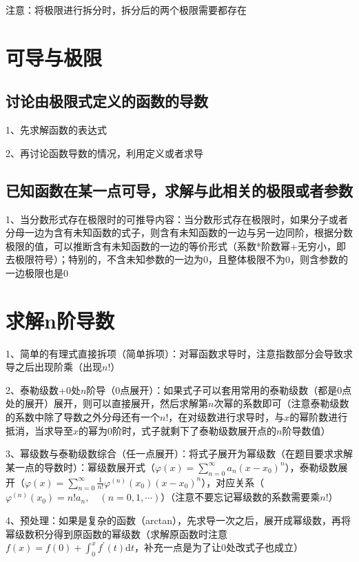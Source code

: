 注意：将极限进行拆分时，拆分后的两个极限需要都存在

\section{可导与极限}



\subsection{讨论由极限式定义的函数的导数}

1、先求解函数的表达式

2、再讨论函数导数的情况，利用定义或者求导



\subsection{已知函数在某一点可导，求解与此相关的极限或者参数}

1、当分数形式存在极限时的可推导内容：当分数形式存在极限时，如果分子或者分母一边为含有未知函数的式子，则含有未知函数的一边与另一边同阶，根据分数极限的值，可以推断含有未知函数的一边的等价形式（系数*阶数幂+无穷小，即去极限符号）；特别的，不含未知参数的一边为0，且整体极限不为0，则含参数的一边极限也是0

\section{求解n阶导数}

1、简单的有理式直接拆项（简单拆项）：对幂函数求导时，注意指数部分会导致求导之后出现阶乘（出现$n!$）

2、泰勒级数+0处$n$阶导（0点展开）：如果式子可以套用常用的泰勒级数（都是0点处的展开）展开，则可以直接展开，然后求解第$n$次幂的系数即可（注意泰勒级数的系数中除了导数之外分母还有一个$n!$，在对级数进行求导时，与$x$的幂阶数进行抵消，当求导至$x$的幂为0阶时，式子就剩下了泰勒级数展开点的$n$阶导数值）

3、幂级数与泰勒级数综合（任一点展开）：将式子展开为幂级数（在题目要求求解某一点的导数时）：幂级数展开式（$\varphi(x)=\sum_{n=0}^{\infty} a_{n}\left(x-x_{0}\right)^{n}$），泰勒级数展开（$\varphi(x)=\sum_{n=0}^{\infty} \frac{1}{n !} \varphi^{(n)}\left(x_{0}\right)\left(x-x_{0}\right)^{n}$），对应关系（$\varphi^{(n)}\left(x_{0}\right)=n ! a_{n}, \quad(n=0,1, \cdots)$）（注意不要忘记幂级数的系数需要乘$n!$）

4、预处理：如果是复杂的函数（arctan），先求导一次之后，展开成幂级数，再将幂级数积分得到原函数的幂级数（求解原函数时注意$f(x)=f(0)+\int_{0}^{x} f^{\prime}(t) \mathrm{d} t$，补充一点是为了让0处改式子也成立）

